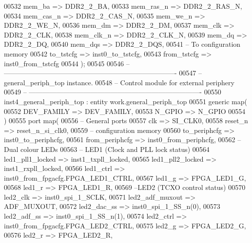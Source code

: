 \begin{DoxyCode}
00532       mem_ba            => DDR2_2_BA,
00533       mem_ras_n         => DDR2_2_RAS_N,
00534       mem_cas_n         => DDR2_2_CAS_N,
00535       mem_we_n          => DDR2_2_WE_N,
00536       mem_dm            => DDR2_2_DM,
00537       mem_clk           => DDR2_2_CLK,
00538       mem_clk_n         => DDR2_2_CLK_N,
00539       mem_dq            => DDR2_2_DQ,
00540       mem_dqs           => DDR2_2_DQS,     
00541 \textcolor{keyword}{      -- To configuration memory}
00542       to_tstcfg         => inst0_to_tstcfg,
00543       from_tstcfg       => inst0_from_tstcfg
00544    \textcolor{vhdlchar}{)};    
00545    
00546 \textcolor{keyword}{-- ----------------------------------------------------------------------------}
00547 \textcolor{keyword}{-- general\_periph\_top instance.}
00548 \textcolor{keyword}{-- Control module for external periphery}
00549 \textcolor{keyword}{-- ----------------------------------------------------------------------------}
00550    inst4\_general\_periph\_top : \textcolor{keywordflow}{entity} work.general_periph_top
00551    \textcolor{keywordflow}{generic} \textcolor{keywordflow}{map}(
00552       DEV_FAMILY  => DEV_FAMILY,
00553       N_GPIO      => N_GPIO
00554    \textcolor{vhdlchar}{)}
00555    \textcolor{keywordflow}{port} \textcolor{keywordflow}{map}(
00556 \textcolor{keyword}{      -- General ports}
00557       clk                  => SI_CLK0,
00558       reset_n              => reset_n_si_clk0,
00559 \textcolor{keyword}{      -- configuration memory}
00560       to_periphcfg         => inst0_to_periphcfg,
00561       from_periphcfg       => inst0_from_periphcfg,     
00562 \textcolor{keyword}{      -- Dual colour LEDs}
00563 \textcolor{keyword}{      -- LED1 (Clock and PLL lock status)}
00564       led1_pll1_locked     => inst1_txpll_locked,
00565       led1_pll2_locked     => inst1_rxpll_locked,
00566       led1_ctrl            => inst0\_from\_fpgacfg.FPGA\_LED1\_CTRL,
00567       led1_g               => FPGA_LED1_G,
00568       led1_r               => FPGA_LED1_R,      
00569 \textcolor{keyword}{      --LED2 (TCXO control status)}
00570       led2_clk             => inst0_spi_1_SCLK,
00571       led2_adf_muxout      => ADF_MUXOUT,
00572       led2_dac_ss          => inst0_spi_1_SS_n\textcolor{vhdlchar}{(}\textcolor{vhdllogic}{0}\textcolor{vhdlchar}{)},
00573       led2_adf_ss          => inst0_spi_1_SS_n\textcolor{vhdlchar}{(}\textcolor{vhdllogic}{1}\textcolor{vhdlchar}{)},
00574       led2_ctrl            => inst0\_from\_fpgacfg.FPGA\_LED2\_CTRL,
00575       led2_g               => FPGA_LED2_G,
00576       led2_r               => FPGA_LED2_R,     

\end{DoxyCode}
